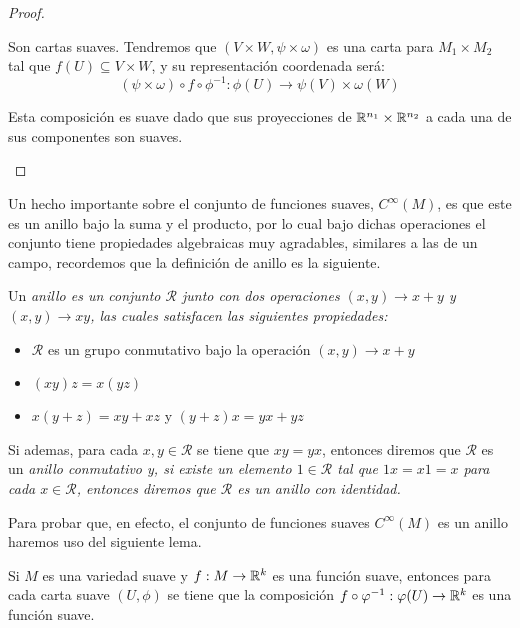 \begin{proof}
\begin{itemize}
		      Son cartas suaves. Tendremos que $(V \times W, \psi \times \omega)$ es una carta para $M_1 \times M_2$ tal que $f(U) \subseteq V \times W$, y su representación coordenada será:
		      \[
			      (\psi \times \omega) \circ f \circ \phi^{-1}: \phi(U) \to \psi(V) \times \omega(W)
		      \]

		      Esta composición es suave dado que sus proyecciones de $\mathbb{R}^{n_1} \times \mathbb{R}^{n_2}$ a cada una de sus componentes son suaves.
	\end{itemize}
\end{proof}

Un hecho importante sobre el conjunto de funciones suaves, $C^{\infty}(M)$, es que este es un anillo bajo la suma y el producto, por lo cual bajo dichas operaciones el conjunto tiene propiedades algebraicas muy agradables, similares a las de un campo, recordemos que la definición de anillo es la siguiente.

\begin{definition}[Anillo]
  Un \it{anillo} es un conjunto $\mathcal{R}$ junto con dos operaciones $(x,y) \to x + y$ y $(x,y) \to xy$, las cuales satisfacen las siguientes propiedades:
	\begin{itemize}
    \item $\mathcal{R}$ es un grupo conmutativo bajo la operación $(x,y) \to x + y$
		\item $(xy)z = x(yz)$
		\item $x(y + z) = xy + xz$ y $(y+z)x = yx + yz$
	\end{itemize}
\end{definition}

Si ademas, para cada $x,y \in \mathcal{R}$ se tiene que $xy = yx$, entonces diremos que $\mathcal{R}$ es un \it{anillo conmutativo} y, si existe un elemento $1 \in \mathcal{R}$ tal que $1x = x1 = x$ para cada $x \in \mathcal{R}$, entonces diremos que $\mathcal{R}$ es un \it{anillo con identidad}.

Para probar que, en efecto, el conjunto de funciones suaves $C^{\infty}(M)$ es un anillo haremos uso del siguiente lema.

\begin{lemma}
	Si $M$ es una variedad suave y $f: M \to \mathbb{R}^{k}$ es una función suave, entonces para cada carta suave $(U,\phi)$ se tiene que la composición $f \circ \varphi^{-1}: \varphi(U) \to \mathbb{R}^{k}$ es una función suave.
\end{lemma}

